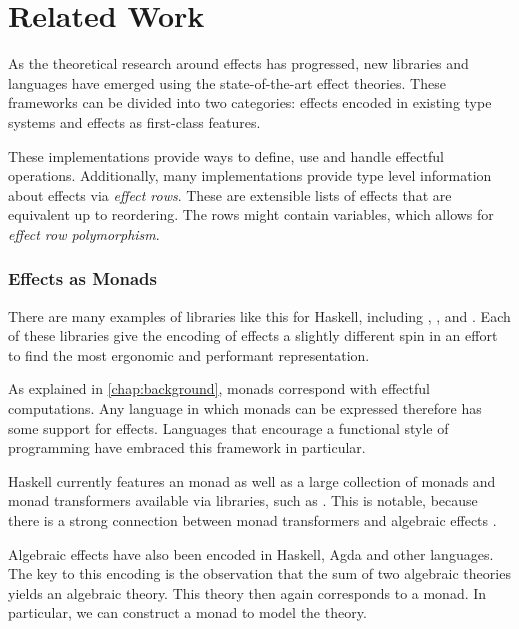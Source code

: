 \chapter{Related Work}\label{chap:related_work}

As the theoretical research around effects has progressed, new libraries and languages have emerged using the state-of-the-art effect theories. These frameworks can be divided into two categories: effects encoded in existing type systems and effects as first-class features.

These implementations provide ways to define, use and handle effectful operations. Additionally, many implementations provide type level information about effects via \emph{effect rows}. These are extensible lists of effects that are equivalent up to reordering. The rows might contain variables, which allows for \emph{effect row polymorphism}.

\subsection{Effects as Monads}

There are many examples of libraries like this for Haskell, including , ,  and . Each of these libraries give the encoding of effects a slightly different spin in an effort to find the most ergonomic and performant representation.

As explained in \cref{chap:background}, monads correspond with effectful computations. Any language in which monads can be expressed therefore has some support for effects. Languages that encourage a functional style of programming have embraced this framework in particular.

Haskell currently features an  monad \autocite{peyton_jones_imperative_1993} as well as a large collection of monads and monad transformers available via libraries, such as . This is notable, because there is a strong connection between monad transformers and algebraic effects \autocite{schrijvers_monad_2019}.

Algebraic effects have also been encoded in Haskell, Agda and other languages. The key to this encoding is the observation that the sum of two algebraic theories yields an algebraic theory. This theory then again corresponds to a monad. In particular, we can construct a  monad to model the theory.\citationneeded


